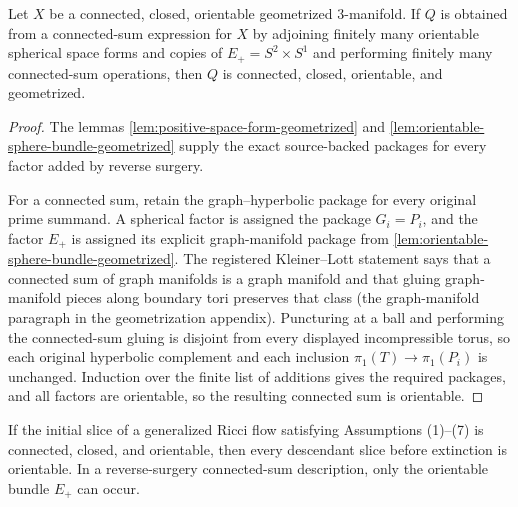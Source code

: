 \begin{lemma}
\label{lem:geometrization-closed-under-standard-factors}
\notready
Let $X$ be a connected, closed, orientable geometrized $3$-manifold.  If
$Q$ is obtained from a connected-sum expression for $X$ by adjoining finitely
many orientable spherical space forms and copies of $E_+=S^2\times S^1$ and
performing finitely many connected-sum operations, then $Q$ is connected,
closed, orientable, and geometrized.
\end{lemma}

\begin{proof}
The lemmas \ref{lem:positive-space-form-geometrized} and
\ref{lem:orientable-sphere-bundle-geometrized} supply the exact source-backed
packages for every factor added by reverse surgery.

For a connected sum, retain the graph--hyperbolic package for every original
prime summand.  A spherical factor is assigned the package $G_i=P_i$, and the
factor $E_+$ is assigned its explicit graph-manifold package from
\ref{lem:orientable-sphere-bundle-geometrized}.  The registered
Kleiner--Lott statement says that a connected sum of graph manifolds is a
graph manifold and that gluing graph-manifold pieces along boundary tori
preserves that class (the graph-manifold paragraph in the geometrization
appendix).  Puncturing at a ball and performing the connected-sum gluing is
disjoint from every displayed incompressible torus, so each original
hyperbolic complement and each inclusion
$\pi_1(T)\to\pi_1(P_i)$ is unchanged.  Induction over the finite list of
additions gives the required packages, and all factors are orientable, so the
resulting connected sum is orientable.
\end{proof}

\begin{lemma}
\label{lem:orientability-preserved-by-surgery}
\notready
If the initial slice of a generalized Ricci flow satisfying Assumptions
(1)--(7) is connected, closed, and orientable, then every descendant slice
before extinction is orientable.  In a reverse-surgery connected-sum
description, only the orientable bundle $E_+$ can occur.
\end{lemma}

